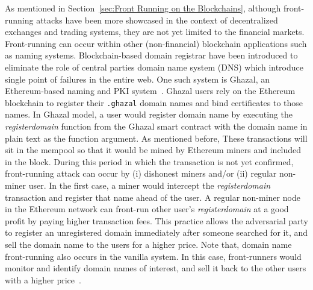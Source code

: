 
\noindent As mentioned in Section~\ref{sec:Front Running on the Blockchains}, although front-running attacks have been more showcased in the context of decentralized exchanges and trading systems, they are not yet limited to the financial markets. Front-running can occur within other (non-financial) blockchain applications such as naming systems. Blockchain-based domain registrar have been introduced to eliminate the role of central parties \ie domain name system (DNS) which introduce single point of failures in the entire web. One such system is Ghazal, an Ethereum-based naming and PKI system~\cite{moosavighazal}. Ghazal users rely on the Ethereum blockchain to register their \texttt{.ghazal} domain names and bind certificates to those names. In Ghazal model, a user would register domain name by executing the \textit{registerdomain} function from the Ghazal smart contract with the domain name in plain text as the function argument. As mentioned before, These transactions will sit in the mempool so that it would be mined by Ethereum miners and included in the block. During this period in which the transaction is not yet confirmed, front-running attack can occur by (i) dishonest miners and/or (ii) regular non-miner user. In the first case, a miner would intercept the \textit{registerdomain} transaction and register that name ahead of the user. A regular non-miner node in the Ethereum network can front-run other user's \textit{registerdomain} at a good profit by paying higher transaction fees. This practice allows the adversarial party  to register an unregistered domain immediately after someone searched for it, and sell the domain name to the users for a higher price. Note that, domain name front-running also occurs in the vanilla system. In this case, front-runners would monitor and identify domain names of interest, and sell it back to the other users with a higher price~\cite{sac022en33:online}.


